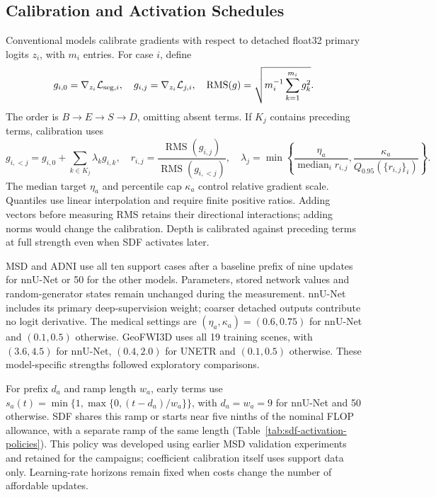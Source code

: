 \documentclass[12pt,a4paper]{article}
\begin{document}
\subsection{Calibration and Activation Schedules}
\label{sec:detailed-calibration}

Conventional models calibrate gradients with respect to detached
float32 primary logits $z_i$, with $m_i$ entries. For case $i$, define
\begin{equation}
g_{i,0}=\nabla_{z_i}\mathcal L_{{\rm seg},i},\quad
g_{i,j}=\nabla_{z_i}\mathcal L_{j,i},\quad
\operatorname{RMS}(g)=\sqrt{m_i^{-1}\sum_{k=1}^{m_i}g_k^2}.
\label{eq:calibration-logit-gradients}
\end{equation}
The order is $B\to E\to S\to D$, omitting absent terms. If $K_j$
contains preceding terms, calibration uses
\begin{equation}
g_{i,<j}=g_{i,0}+\sum_{k\in K_j}\lambda_k g_{i,k},\quad
r_{i,j}=\frac{\operatorname{RMS}(g_{i,j})}{\operatorname{RMS}(g_{i,<j})},\quad
\lambda_j=\min\left\{\frac{\eta_a}{\operatorname{median}_i r_{i,j}},
\frac{\kappa_a}{Q_{0.95}(\{r_{i,j}\}_i)}\right\}.
\label{eq:constraint-calibrated-coefficient}
\end{equation}
The median target $\eta_a$ and percentile cap $\kappa_a$ control relative
gradient scale. Quantiles use linear interpolation and require finite
positive ratios. Adding vectors before measuring RMS retains their
directional interactions; adding norms would change the calibration.
Depth is calibrated against preceding terms at full strength even when
SDF activates later.

MSD and ADNI use all ten support cases after a baseline prefix of nine
updates for nnU-Net or 50 for the other models. Parameters, stored
network values and random-generator states remain unchanged during
the measurement. nnU-Net includes its primary deep-supervision weight;
coarser detached outputs contribute no logit derivative. The medical
settings are $(\eta_a,\kappa_a)=(0.6,0.75)$ for nnU-Net and
$(0.1,0.5)$ otherwise. GeoFWI3D uses all 19 training scenes, with
$(3.6,4.5)$ for nnU-Net, $(0.4,2.0)$ for UNETR and $(0.1,0.5)$
otherwise. These model-specific strengths followed exploratory comparisons.

For prefix $d_a$ and ramp length $w_a$, early terms use
$s_a(t)=\min\{1,\max\{0,(t-d_a)/w_a\}\}$, with $d_a=w_a=9$
for nnU-Net and 50 otherwise. SDF shares this ramp or starts near
five ninths of the nominal FLOP allowance, with a separate ramp of
the same length (Table~\ref{tab:sdf-activation-policies}). This policy
was developed using earlier MSD validation experiments and retained
for the campaigns; coefficient calibration itself uses support data
only. Learning-rate horizons remain fixed when costs change the number
of affordable updates.
\end{document}
